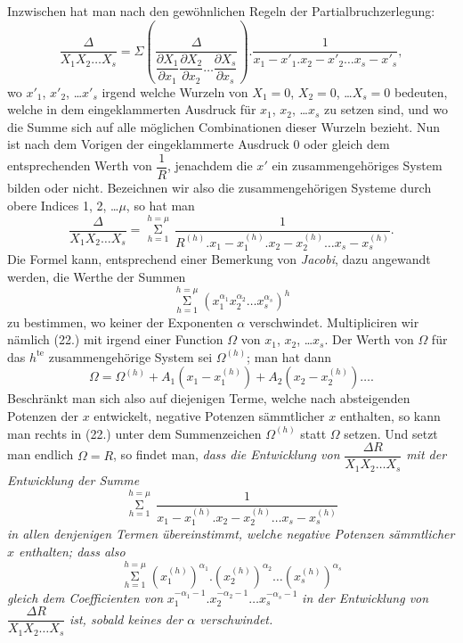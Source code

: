 \documentclass{article}
\begin{document}
Inzwischen hat man nach den gewöhnlichen Regeln der Partialbruchzerlegung:
\[
\frac{\Delta}{X_{1}X_{2}\ldots X_{s}} = \Sigma\left(\frac{\Delta}{\dfrac{\partial X_{1}}{\partial x_{1}}\dfrac{\partial X_{2}}{\partial x_{2}}\ldots\dfrac{\partial X_{s}}{\partial x_{s}}}\right).\frac{1}{x_{1}-x'_{1}.x_{2}-x'_{2}\ldots x_{s}-x'_{s}},
\]
wo $x'_{1}$, $x'_{2}$, \ldots $x'_{s}$ irgend welche Wurzeln von $X_{1}=0$, $X_{2}=0$, \ldots $X_{s}=0$ bedeuten, welche in dem eingeklammerten Ausdruck für $x_{1}$, $x_{2}$, \ldots $x_{s}$ zu setzen sind, und wo die Summe sich auf alle möglichen Combinationen dieser Wurzeln bezieht. Nun ist nach dem Vorigen der eingeklammerte Ausdruck 0 oder gleich dem entsprechenden Werth von $\dfrac{1}{R}$, jenachdem die $x'$ ein zusammengehöriges System bilden oder nicht. Bezeichnen wir also die zusammengehörigen Systeme durch obere Indices 1, 2, \ldots $\mu$, so hat man
\[
\frac{\Delta}{X_{1}X_{2}\ldots X_{s}} = \mathop{\Sigma}\limits_{h=1}^{h=\mu}\,\frac{1}{R^{(h)}.x_{1}-x_{1}^{(h)}.x_{2}-x_{2}^{(h)}\ldots x_{s}-x_{s}^{(h)}}. \tag{22.}
\]
Die Formel kann, entsprechend einer Bemerkung von \emph{Jacobi}, dazu angewandt werden, die Werthe der Summen
\[
\mathop{\Sigma}\limits_{h=1}^{h=\mu}\left(x_{1}^{\alpha_{1}}x_{2}^{\alpha_{2}}\ldots x_{s}^{\alpha_{s}}\right)^{h}
\]
zu bestimmen, wo keiner der Exponenten $\alpha$ verschwindet. Multipliciren wir nämlich (22.) mit irgend einer Function $\Omega$ von $x_{1}$, $x_{2}$, \ldots $x_{s}$. Der Werth von $\Omega$ für das $h^{\text{te}}$ zusammengehörige System sei $\Omega^{(h)}$; man hat dann
\[
\Omega = \Omega^{(h)}+A_{1}(x_{1}-x_{1}^{(h)})+A_{2}(x_{2}-x_{2}^{(h)})\ldots.
\]
Beschränkt man sich also auf diejenigen Terme, welche nach absteigenden Potenzen der $x$ entwickelt, negative Potenzen sämmtlicher $x$ enthalten, so kann man rechts in (22.) unter dem Summenzeichen $\Omega^{(h)}$ statt $\Omega$ setzen. Und setzt man endlich $\Omega=R$, so findet man, \emph{dass die Entwicklung von} $\dfrac{\Delta R}{X_{1}X_{2}\ldots X_{s}}$ \emph{mit der Entwicklung der Summe}
\[
\mathop{\Sigma}\limits_{h=1}^{h=\mu}\,\frac{1}{x_{1}-x_{1}^{(h)}.x_{2}-x_{2}^{(h)}\ldots x_{s}-x_{s}^{(h)}}
\]
\emph{in allen denjenigen Termen übereinstimmt, welche negative Potenzen sämmtlicher $x$ enthalten; dass also}
\[
\mathop{\Sigma}\limits_{h=1}^{h=\mu}\left(x_{1}^{(h)}\right)^{\alpha_{1}}.\left(x_{2}^{(h)}\right)^{\alpha_{2}}\ldots\left(x_{s}^{(h)}\right)^{\alpha_{s}}
\]
\emph{gleich dem Coefficienten von} $x_{1}^{-\alpha_{1}-1}.x_{2}^{-\alpha_{2}-1}\ldots x_{s}^{-\alpha_{s}-1}$ \emph{in der Entwicklung von} $\dfrac{\Delta R}{X_{1}X_{2}\ldots X_{s}}$ \emph{ist, sobald keines der $\alpha$ verschwindet.}
\end{document}
